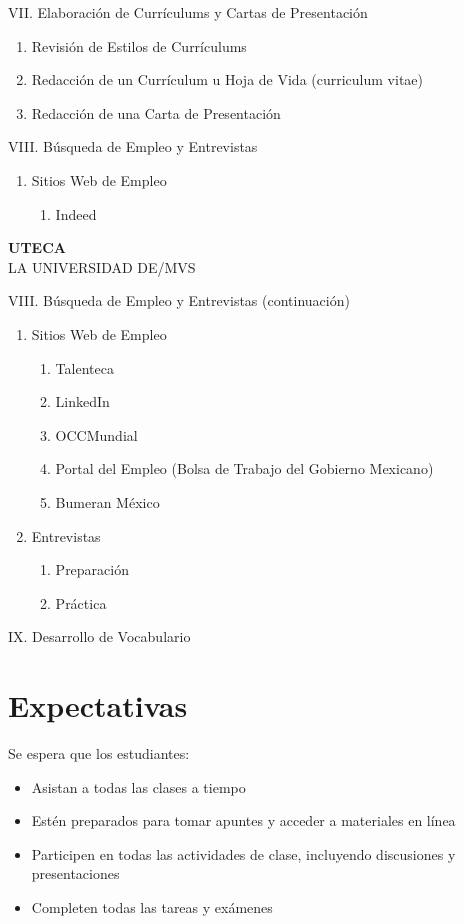 \documentclass[12pt]{article}
\begin{document}
\noindent VII. Elaboración de Currículums y Cartas de Presentación
\begin{enumerate}
    \item Revisión de Estilos de Currículums
    \item Redacción de un Currículum u Hoja de Vida (curriculum vitae)
    \item Redacción de una Carta de Presentación
\end{enumerate}

\noindent VIII. Búsqueda de Empleo y Entrevistas
\begin{enumerate}
    \item Sitios Web de Empleo
    \begin{enumerate}
        \item Indeed
    \end{enumerate}
\end{enumerate}

\clearpage %

\noindent\textbf{UTECA} \\
\noindent LA UNIVERSIDAD DE/MVS

\vspace{1cm}

\noindent VIII. Búsqueda de Empleo y Entrevistas (continuación)
\begin{enumerate}
     \item Sitios Web de Empleo
    \begin{enumerate}
        \item Talenteca
        \item LinkedIn
        \item OCCMundial
        \item Portal del Empleo (Bolsa de Trabajo del Gobierno Mexicano)
        \item Bumeran México
    \end{enumerate}
    \item Entrevistas
    \begin{enumerate}
        \item Preparación
        \item Práctica
    \end{enumerate}
\end{enumerate}

\noindent IX. Desarrollo de Vocabulario

\section*{Expectativas}
Se espera que los estudiantes:
\begin{itemize}
    \item Asistan a todas las clases a tiempo
    \item Estén preparados para tomar apuntes y acceder a materiales en línea
    \item Participen en todas las actividades de clase, incluyendo discusiones y presentaciones
    \item Completen todas las tareas y exámenes
\end{itemize}
\end{document}
